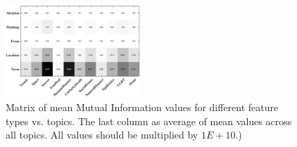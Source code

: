 
\begin{figure}[t!]
\centering
\includegraphics[width=0.45\textwidth]{images/avgMI_gray.pdf}%
\caption{Matrix of mean Mutual Information values for different feature types vs. topics.  The last column as average of mean values across all topics.  All values should be multiplied by $1E+10$.)}
\label{fig:avgMI}
\end{figure}

